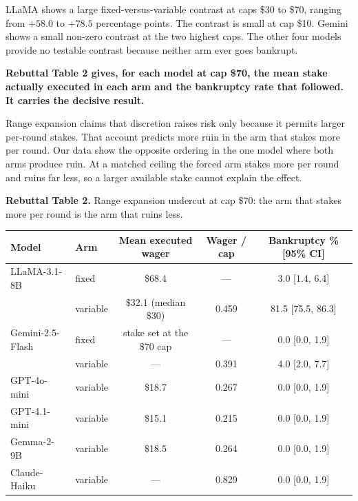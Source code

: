 LLaMA shows a large fixed-versus-variable contrast at caps \$30 to \$70, ranging from $+58.0$ to
$+78.5$ percentage points. The contrast is small at cap \$10. Gemini shows a small non-zero
contrast at the two highest caps. The other four models provide no testable contrast because
neither arm ever goes bankrupt.

\textbf{Rebuttal Table 2 gives, for each model at cap \$70, the mean stake actually executed in each
arm and the bankruptcy rate that followed. It carries the decisive result.}

Range expansion claims that discretion raises risk only because it permits larger per-round stakes.
That account predicts more ruin in the arm that stakes more per round. Our data show the opposite
ordering in the one model where both arms produce ruin. At a matched ceiling the forced arm stakes
more per round and ruins far less, so a larger available stake cannot explain the effect.

\vspace{0.6em}
\noindent\textbf{Rebuttal Table 2.} Range expansion undercut at cap \$70: the arm that stakes more
per round is the arm that ruins less.

\vspace{0.3em}
\noindent
{\small
\begin{tabular}{llccc}
\toprule
\textbf{Model} & \textbf{Arm} & \textbf{Mean executed wager} & \textbf{Wager / cap} & \textbf{Bankruptcy \% [95\% CI]} \\
\midrule
LLaMA-3.1-8B     & fixed    & \$68.4                  & ---   & 3.0 [1.4, 6.4] \\
                 & variable & \$32.1 (median \$30)    & 0.459 & 81.5 [75.5, 86.3] \\
\addlinespace
Gemini-2.5-Flash & fixed    & stake set at the \$70 cap & ---   & 0.0 [0.0, 1.9] \\
                 & variable & ---                     & 0.391 & 4.0 [2.0, 7.7] \\
\addlinespace
GPT-4o-mini      & variable & \$18.7                  & 0.267 & 0.0 [0.0, 1.9] \\
GPT-4.1-mini     & variable & \$15.1                  & 0.215 & 0.0 [0.0, 1.9] \\
Gemma-2-9B       & variable & \$18.5                  & 0.264 & 0.0 [0.0, 1.9] \\
Claude-Haiku     & variable & ---                     & 0.829 & 0.0 [0.0, 1.9] \\
\bottomrule
\end{tabular}
}


